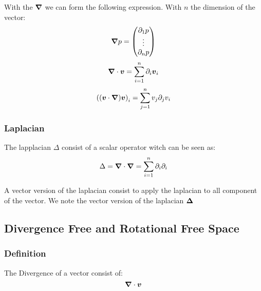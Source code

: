 With the ${\boldsymbol \nabla}$ we can form the following expression.
With $n$ the dimension of the vector:
\begin{equation}
 {\boldsymbol \nabla}p=\begin{pmatrix}\partial_1 p\\ \vdots \\ \partial_n p\end{pmatrix}
\end{equation}
\begin{equation}
 {\boldsymbol \nabla}\cdot {\boldsymbol v}=\sum_{i=1}^{n}\partial_i {\boldsymbol v}_i
\end{equation}
\begin{equation}
 \left(({\boldsymbol v}\cdot{\boldsymbol \nabla}){\boldsymbol v}\right)_{i}=\sum_{j=1}^{n}v_{j}\partial_{j} v_{i}
\end{equation}

\subsubsection{Laplacian}

\begin{definition}
The lapplacian $\Delta$ consist of a scalar operator witch can be seen as:
\begin{equation}
\Delta={\boldsymbol \nabla}\cdot {\boldsymbol \nabla}=\sum_{i=1}^{n} \partial_{i}\partial_{i}
\end{equation}
\end{definition}

\begin{definition}
A vector version of the laplacian consist to apply the laplacian to all component of the vector.
We note the vector version of the laplacian ${\boldsymbol \Delta}$
\end{definition}
\subsection{Divergence Free and Rotational Free Space}

\subsubsection{Definition}

\begin{definition}
 The Divergence of a vector consist of:
 \begin{equation}
  {\boldsymbol \nabla} \cdot {\boldsymbol v}
  \end{equation}
\end{definition}

